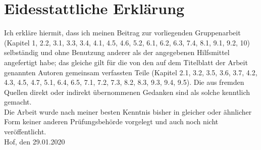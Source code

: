 \chapter*{Eidesstattliche Erklärung}
Ich erkläre hiermit, dass ich meinen Beitrag zur vorliegenden Gruppenarbeit (Kapitel 1, 2.2, 3.1, 3.3, 3.4, 4.1, 4.5, 4.6, 5.2, 6.1, 6.2, 6.3, 7.4, 8.1, 9.1, 9.2, 10) selbständig und ohne Benutzung anderer als der angegebenen Hilfsmittel angefertigt habe; das gleiche gilt für die von den auf dem Titelblatt der Arbeit genannten Autoren gemeinsam verfassten Teile (Kapitel 2.1, 3.2, 3.5, 3.6, 3.7, 4.2, 4.3, 4.5, 4.7, 5.1, 6.4, 6.5, 7.1, 7.2, 7.3, 8.2, 8.3, 9.3, 9.4, 9.5). 
Die aus fremden Quellen direkt oder indirekt übernommenen Gedanken sind als solche kenntlich gemacht.\\
\linebreak
Die Arbeit wurde nach meiner besten Kenntnis bisher in gleicher oder ähnlicher Form keiner anderen Prüfungsbehörde vorgelegt und auch noch nicht veröffentlicht.\\
\linebreak
\linebreak
\linebreak
Hof, den 29.01.2020




